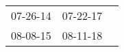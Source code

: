 \begin{supertabular}{p{0.33\columnwidth}p{0.33\columnwidth}p{0.33\columnwidth}}
 07-26-14\textsuperscript{} &  07-22-17\textsuperscript{} \\
 08-08-15\textsuperscript{} &  08-11-18\textsuperscript{} \\
\end{supertabular}
